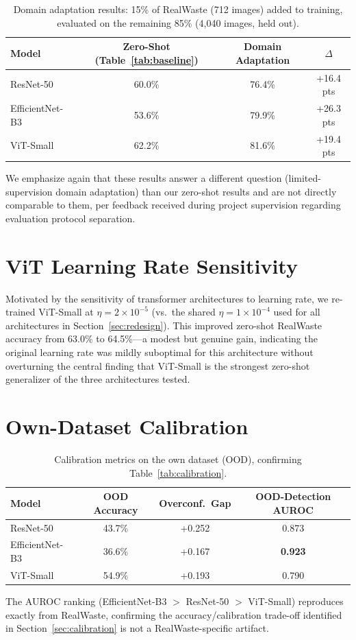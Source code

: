 \documentclass[a4paper]{article}
\begin{document}
\begin{table}[h]
\caption{Domain adaptation results: 15\% of RealWaste (712 images) added to training, evaluated on the remaining 85\% (4{,}040 images, held out).}
\label{tab:adaptation}
\centering
\begin{tabular}{lccc}
\toprule
Model & Zero-Shot (Table~\ref{tab:baseline}) & Domain Adaptation & $\Delta$ \\
\midrule
ResNet-50 & 60.0\% & 76.4\% & +16.4 pts \\
EfficientNet-B3 & 53.6\% & 79.9\% & +26.3 pts \\
ViT-Small & 62.2\% & 81.6\% & +19.4 pts \\
\bottomrule
\end{tabular}
\end{table}

We emphasize again that these results answer a different question (limited-supervision domain adaptation) than our zero-shot results and are not directly comparable to them, per feedback received during project supervision regarding evaluation protocol separation.

\section{ViT Learning Rate Sensitivity}
\label{app:lr}
Motivated by the sensitivity of transformer architectures to learning rate, we re-trained ViT-Small at $\eta=2\times10^{-5}$ (vs.\ the shared $\eta=1\times10^{-4}$ used for all architectures in Section~\ref{sec:redesign}). This improved zero-shot RealWaste accuracy from 63.0\% to 64.5\%---a modest but genuine gain, indicating the original learning rate was mildly suboptimal for this architecture without overturning the central finding that ViT-Small is the strongest zero-shot generalizer of the three architectures tested.

\section{Own-Dataset Calibration}
\label{app:calibration}
\begin{table}[h]
\caption{Calibration metrics on the own dataset (OOD), confirming Table~\ref{tab:calibration}.}
\centering
\begin{tabular}{lccc}
\toprule
Model & OOD Accuracy & Overconf.\ Gap & OOD-Detection AUROC \\
\midrule
ResNet-50 & 43.7\% & +0.252 & 0.873 \\
EfficientNet-B3 & 36.6\% & +0.167 & \textbf{0.923} \\
ViT-Small & 54.9\% & +0.193 & 0.790 \\
\bottomrule
\end{tabular}
\end{table}
The AUROC ranking (EfficientNet-B3 $>$ ResNet-50 $>$ ViT-Small) reproduces exactly from RealWaste, confirming the accuracy/calibration trade-off identified in Section~\ref{sec:calibration} is not a RealWaste-specific artifact.
\end{document}
